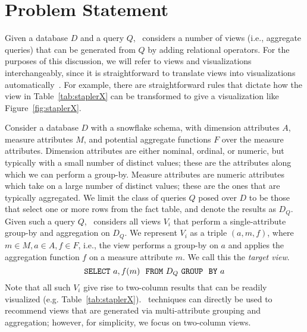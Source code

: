 

\section{Problem Statement}
\label{sec:problem_statement}

Given a database $D$ and a query $Q$, \VizRecDB\ considers a number of views (i.e., aggregate queries) that
can be generated from $Q$ by adding relational operators.
For the purposes of this discussion, we will refer to views and visualizations
interchangeably, since it is straightforward to translate views into
visualizations automatically~\cite{DBLP:journals/cacm/StolteTH08}. 
For example, there are straightforward rules that
dictate how the view in Table~\ref{tab:staplerX} can be transformed to give a
visualization like Figure~\ref{fig:staplerX}.





Consider a database $D$ with a snowflake schema,
with dimension attributes $A$, measure attributes $M$, and potential
aggregate functions $F$ over the measure attributes.
Dimension attributes are either nominal, ordinal, or numeric,
but typically with a small number of distinct values;
these are the attributes along which we can perform a group-by.
Measure attributes are numeric attributes which take on a large number 
of distinct values; 
these are the ones that are typically aggregated.
We limit the class of queries $Q$ posed over $D$ to be
those that select one or more rows from the fact table, and denote the results
as $D_Q$. 
Given such a query $Q$, \VizRecDB\ considers all views $V_i$ that perform a
single-attribute group-by and aggregation on $D_Q$. 
We represent $V_i$ as a
triple $(a, m, f)$, where $m \in M, a \in A, f \in F$, i.e., the view
performs a group-by on $a$ and applies the aggregation function $f$ on a measure
attribute $m$. We call this the {\em target view}.
$${\tt SELECT \ } a, f(m) \ \ {\tt FROM} \  D_Q\  {\tt GROUP \ \ BY} \ a$$ 
Note that all such $V_i$ give rise to two-column results that can 
be readily visualized (e.g.
Table~\ref{tab:staplerX}). 
\VizRecDB\ techniques can directly be used to recommend views that are
generated via multi-attribute grouping and aggregation; however,
for simplicity, we focus on two-column views. 


